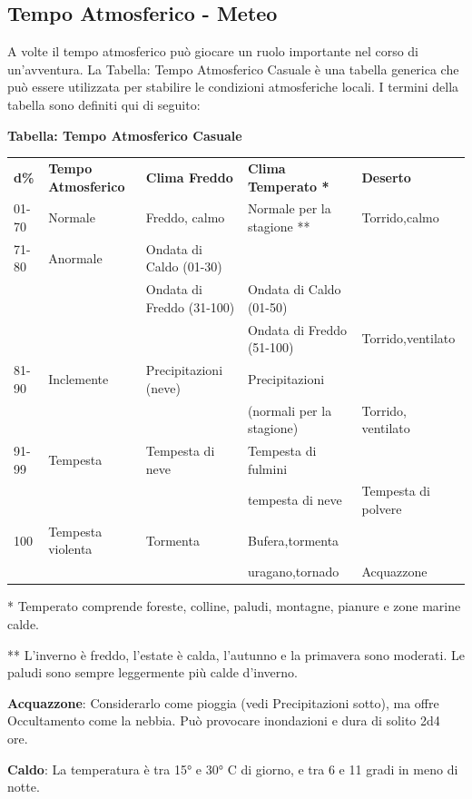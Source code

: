 \documentclass[a4paper,11pt,twoside,openany]{book}
\begin{document}
\subsection{Tempo Atmosferico - Meteo}

\label{tempo-atmosferico---meteo}

A volte il tempo atmosferico può giocare un ruolo importante nel corso di un'avventura. La Tabella: Tempo Atmosferico Casuale è una tabella generica che può essere utilizzata per stabilire le condizioni atmosferiche locali. I termini della tabella sono definiti qui di seguito:

\bigskip

\textbf{Tabella: Tempo Atmosferico Casuale}

\begin{tabularx}{\textwidth}{lXXXX}
	\toprule
	\textbf{d\%} & \textbf{Tempo Atmosferico} & \textbf{Clima Freddo}& \textbf{Clima Temperato {*}}   & \textbf{Deserto}\tabularnewline
	01-70   & Normale& Freddo, calmo   & Normale per la stagione {*}{*} & Torrido,calmo\tabularnewline
	71-80   & Anormale    & Ondata di Caldo (01-30)   \\
	   &   & Ondata di Freddo (31-100) & Ondata di Caldo (01-50)\\
	   &   &  & Ondata di Freddo (51-100) & Torrido,ventilato\tabularnewline
	81-90   & Inclemente  & Precipitazioni (neve)& Precipitazioni    \\
	   &   &  & (normali per la stagione) & Torrido, ventilato\tabularnewline
	91-99   & Tempesta    & Tempesta di neve& Tempesta di fulmini    \\
	   &   &  & tempesta di neve& Tempesta di polvere\tabularnewline
	100& Tempesta violenta& Tormenta   & Bufera,tormenta   \\
	   &   &  & uragano,tornado & Acquazzone\tabularnewline
\end{tabularx}

* Temperato comprende foreste, colline, paludi, montagne, pianure
e zone marine calde.

** L'inverno è freddo, l'estate è calda, l'autunno e la primavera sono moderati. Le paludi sono sempre leggermente più calde d'inverno.

\bigskip

\textbf{Acquazzone}: Considerarlo come pioggia (vedi Precipitazioni sotto), ma offre Occultamento come la nebbia. Può provocare inondazioni e dura di solito 2d4 ore.

\textbf{Caldo}: La temperatura è tra 15° e 30° C di giorno, e tra 6 e 11 gradi in meno di notte.
\end{document}
